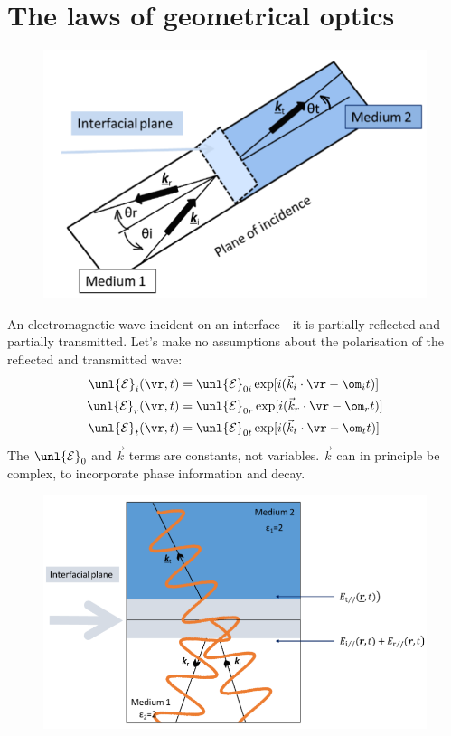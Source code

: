 \documentclass[a4paper, 11pt, normalem]{report}
\renewcommand\E{\mathcal{E}}
\newcommand\uE{\unl{\E}}
\begin{document}
\section{The laws of geometrical optics}

\begin{figure}[H]
	\centering
	\includegraphics[scale=0.4]{geolaw.png}
\end{figure}

An electromagnetic wave incident on an interface - it is partially reflected and partially transmitted.
Let's make no assumptions about the polarisation of the reflected and transmitted wave:
\begin{align}
	\uE_i(\vr,t) &= \uE_{0i}\exp[i(\vec{k}_i\cdot\vr - \om_it)] \\
	\uE_r(\vr,t) &= \uE_{0r}\exp[i(\vec{k}_r\cdot\vr - \om_rt)] \\
	\uE_t(\vr,t) &= \uE_{0t}\exp[i(\vec{k}_t\cdot\vr - \om_tt)]
\end{align}
The $\uE_0$ and $\vec{k}$ terms are constants, not variables.
$\vec{k}$ can in principle be complex, to incorporate phase information and decay.

\begin{figure}[H]
	\centering
	\includegraphics[scale=0.4]{geolaw2.png}
\end{figure}
\end{document}
